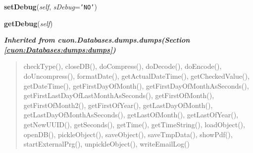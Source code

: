     \vspace{0.5ex}

\hspace{.8\funcindent}\begin{boxedminipage}{\funcwidth}

    \raggedright \textbf{setDebug}(\textit{self}, \textit{sDebug}={\tt \texttt{'}\texttt{NO}\texttt{'}})

\setlength{\parskip}{2ex}
\setlength{\parskip}{1ex}
    \end{boxedminipage}

    \label{cuon:User:user:User:getDebug}

    \vspace{0.5ex}

\hspace{.8\funcindent}\begin{boxedminipage}{\funcwidth}

    \raggedright \textbf{getDebug}(\textit{self})

\setlength{\parskip}{2ex}
\setlength{\parskip}{1ex}
    \end{boxedminipage}


\large{\textbf{\textit{Inherited from cuon.Databases.dumps.dumps\textit{(Section \ref{cuon:Databases:dumps:dumps})}}}}

\begin{quote}
checkType(), closeDB(), doCompress(), doDecode(), doEncode(), doUncompress(), formatDate(), getActualDateTime(), getCheckedValue(), getDateTime(), getFirstDayOfMonth(), getFirstDayOfMonthAsSeconds(), getFirstLastDayOfLastMonthAsSeconds(), getFirstOfMonth(), getFirstOfMonth2(), getFirstOfYear(), getLastDayOfMonth(), getLastDayOfMonthAsSeconds(), getLastOfMonth(), getLastOfYear(), getNewUUID(), getSeconds(), getTime(), getTimeString(), loadObject(), openDB(), pickleObject(), saveObject(), saveTmpData(), showPdf(), startExternalPrg(), unpickleObject(), writeEmailLog()
\end{quote}
